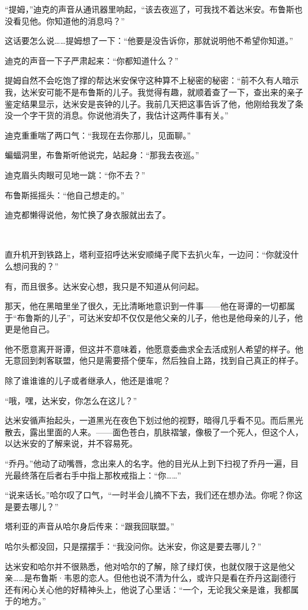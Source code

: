 \documentclass[../main]{subfiles}
\begin{document}
“提姆，”迪克的声音从通讯器里响起，“该去夜巡了，可我找不着达米安。布鲁斯也没看见他。你知道他的消息吗？”

这话要怎么说……提姆想了一下：“他要是没告诉你，那就说明他不希望你知道。”

迪克的声音一下子严肃起来：“你都知道什么？”

提姆自然不会吃饱了撑的帮达米安保守这种算不上秘密的秘密：“前不久有人暗示我，达米安可能不是布鲁斯的儿子。我觉得有趣，就顺着查了一下，查出来的亲子鉴定结果显示，达米安是丧钟的儿子。我前几天把这事告诉了他，他刚给我发了条没一个字干货的消息。你说他消失了，我估计这两件事有关。”

迪克重重喘了两口气：“我现在去你那儿，见面聊。”

蝙蝠洞里，布鲁斯听他说完，站起身：“那我去夜巡。”

迪克眉头肉眼可见地一跳：“你不去？”

布鲁斯摇摇头：“他自己想走的。”

迪克都懒得说他，匆忙换了身衣服就出去了。

~\

直升机开到铁路上，塔利亚招呼达米安顺绳子爬下去扒火车，一边问：“你就没什么想问我的？”

有，而且很多。达米安心想，我只是不知道从何问起。

那天，他在黑暗里坐了很久，无比清晰地意识到一件事——他在哥谭的一切都属于“布鲁斯的儿子”，可达米安却不仅仅是他父亲的儿子，他也是他母亲的儿子，他更是他自己。

他不愿意离开哥谭，但这并不意味着，他愿意委曲求全去活成别人希望的样子。他无意回到刺客联盟，他只是需要搭个便车，然后独自上路，找到自己真正的样子。

除了谁谁谁的儿子或者继承人，他还是谁呢？

“哦，嘿，达米安，你怎么在这儿？”

达米安循声抬起头，一道黑光在夜色下划过他的视野，暗得几乎看不见。而后黑光散去，露出里面的人来。——面色苍白，肌肤褶皱，像极了一个死人，但这个人，以达米安的了解来说，并不容易死。

“乔丹。”他动了动嘴唇，念出来人的名字。他的目光从上到下扫视了乔丹一遍，目光最终落在后者右手中指上那枚戒指上：“你……”

“说来话长。”哈尔叹了口气，“一时半会儿摘不下去，我们还在想办法。你呢？你这是要去哪儿？”

塔利亚的声音从哈尔身后传来：“跟我回联盟。”

哈尔头都没回，只是摆摆手：“我没问你。达米安，你这是要去哪儿？”

达米安和哈尔并不很熟悉，他对哈尔的了解，除了绿灯侠，也就仅限于这是他父亲……是布鲁斯·韦恩的恋人。但他也说不清为什么，或许只是看在乔丹这副德行还有闲心关心他的好精神头上，他说了心里话：“一个，无论我父亲是谁，我都属于的地方。”
\end{document}
